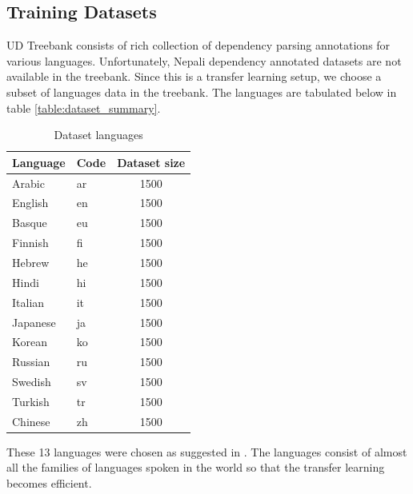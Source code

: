 \subsection{Training Datasets}
UD Treebank consists of rich collection of dependency parsing
annotations for various languages. Unfortunately, Nepali dependency
annotated datasets are not available in the treebank. Since this is a
transfer learning setup, we choose a subset of languages data in the treebank.
The languages are tabulated below in table \ref{table:dataset_summary}.
\begin{table}[!ht]
    \begin{center}
        \begin{tabular}{|l|l|c|}
            \hline
            \textbf{Language} & \textbf{Code} & \textbf{Dataset size} \\
            \hline
            Arabic & ar & 1500 \\
            \hline
            English & en & 1500 \\
            \hline
            Basque & eu & 1500 \\
            \hline
            Finnish & fi & 1500 \\
            \hline
            Hebrew & he & 1500 \\
            \hline
            Hindi & hi & 1500 \\
            \hline
            Italian & it & 1500 \\
            \hline
            Japanese & ja & 1500 \\
            \hline
            Korean & ko & 1500 \\
            \hline
            Russian & ru & 1500 \\
            \hline
            Swedish & sv & 1500 \\
            \hline
            Turkish & tr & 1500 \\
            \hline
            Chinese & zh & 1500 \\
            \hline
        \end{tabular}
        \caption{Dataset languages}
        \label{table:dataset_languages}
    \end{center}
\end{table}
These 13 languages were chosen as suggested in \cite{udapter}. The
languages consist of almost all the families of languages spoken in the world
so that the transfer learning becomes efficient.

